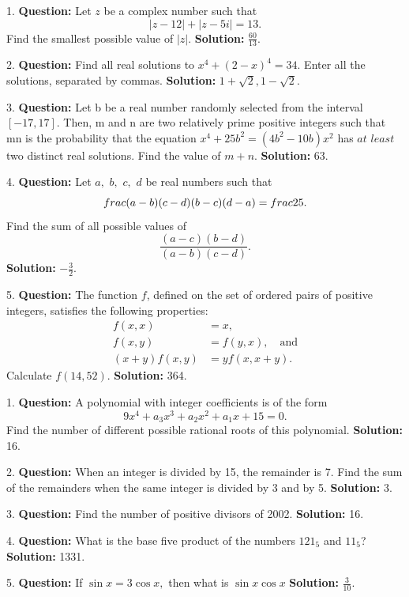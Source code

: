 \begin{tcolorbox}[casestudy={Frequently Selected Prompts After Stage 2}]
1. \textbf{Question:} Let $z$ be a complex number such that
\[|z - 12| + |z - 5i| = 13.\]
Find the smallest possible value of $|z|.$ \textbf{Solution:} $\frac{60}{13}$.
\vspace{0.2cm}

2. \textbf{Question:} Find all real solutions to $x^4+(2-x)^4=34$.  Enter all the solutions, separated by commas.  
\textbf{Solution:} $1 + \sqrt{2}, 1 - \sqrt{2}$.
\vspace{0.2cm}

3. \textbf{Question:} Let b be a real number randomly selected from the interval $[-17,17]$. Then, m and n are two relatively prime positive integers such that m\/n is the probability that the equation $x^4+25b^2=(4b^2-10b)x^2$ has $\textit{at least}$ two distinct real solutions. Find the value of $m+n$. 
\textbf{Solution:} 63.
\vspace{0.2cm}

4. \textbf{Question:} Let $a,$ $b,$ $c,$ $d$ be real numbers such that\[\\frac{(a - b)(c - d)}{(b - c)(d - a)} = \\frac{2}{5}.\]Find the sum of all possible values of\[\frac{(a - c)(b - d)}{(a - b)(c - d)}.\]  
\textbf{Solution:} $-\frac{3}{2}$.
\vspace{0.2cm}

5. \textbf{Question:} The function $f$, defined on the set of ordered pairs of positive integers, satisfies the following properties: 
\begin{align*}  f(x,x) &=x, \\  f(x,y) &=f(y,x), \quad \text{and} \\ (x + y) f(x,y) &= yf(x,x + y).  
\end{align*}
Calculate $f(14,52)$. 
\textbf{Solution:} 364.
\end{tcolorbox}


\begin{tcolorbox}[casestudy={Prompts Frequently Selected by Stage 1 but Skipped by Stage 2}]
1. \textbf{Question:} A polynomial with integer coefficients is of the form
\[9x^4 + a_3 x^3 + a_2 x^2 + a_1 x + 15 = 0.\]
Find the number of different possible rational roots of this polynomial.
\textbf{Solution:} 16.
\vspace{0.2cm}

2. \textbf{Question:} When an integer is divided by 15, the remainder is 7. Find the sum of the remainders when the same integer is divided by 3 and by 5.  
\textbf{Solution:} 3.
\vspace{0.2cm}

3. \textbf{Question:} Find the number of positive divisors of 2002.  
\textbf{Solution:} 16.
\vspace{0.2cm}

4. \textbf{Question:} What is the base five product of the numbers $121_{5}$ and $11_{5}$?
\textbf{Solution:} 1331.
\vspace{0.2cm}

5. \textbf{Question:} If $\sin x = 3 \cos x,$ then what is $\sin x \cos x$ 
\textbf{Solution:} $\frac{3}{10}$.
\end{tcolorbox}
